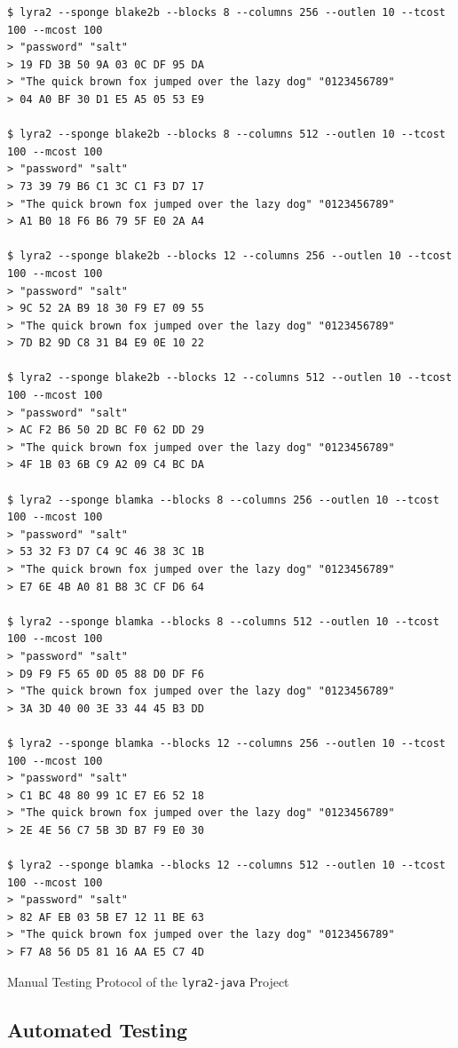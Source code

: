 \begin{listing}
\begin{verbatim}
$ lyra2 --sponge blake2b --blocks 8 --columns 256 --outlen 10 --tcost 100 --mcost 100
> "password" "salt"
> 19 FD 3B 50 9A 03 0C DF 95 DA
> "The quick brown fox jumped over the lazy dog" "0123456789"
> 04 A0 BF 30 D1 E5 A5 05 53 E9

$ lyra2 --sponge blake2b --blocks 8 --columns 512 --outlen 10 --tcost 100 --mcost 100
> "password" "salt"
> 73 39 79 B6 C1 3C C1 F3 D7 17
> "The quick brown fox jumped over the lazy dog" "0123456789"
> A1 B0 18 F6 B6 79 5F E0 2A A4

$ lyra2 --sponge blake2b --blocks 12 --columns 256 --outlen 10 --tcost 100 --mcost 100
> "password" "salt"
> 9C 52 2A B9 18 30 F9 E7 09 55
> "The quick brown fox jumped over the lazy dog" "0123456789"
> 7D B2 9D C8 31 B4 E9 0E 10 22

$ lyra2 --sponge blake2b --blocks 12 --columns 512 --outlen 10 --tcost 100 --mcost 100
> "password" "salt"
> AC F2 B6 50 2D BC F0 62 DD 29
> "The quick brown fox jumped over the lazy dog" "0123456789"
> 4F 1B 03 6B C9 A2 09 C4 BC DA

$ lyra2 --sponge blamka --blocks 8 --columns 256 --outlen 10 --tcost 100 --mcost 100
> "password" "salt"
> 53 32 F3 D7 C4 9C 46 38 3C 1B
> "The quick brown fox jumped over the lazy dog" "0123456789"
> E7 6E 4B A0 81 B8 3C CF D6 64

$ lyra2 --sponge blamka --blocks 8 --columns 512 --outlen 10 --tcost 100 --mcost 100
> "password" "salt"
> D9 F9 F5 65 0D 05 88 D0 DF F6
> "The quick brown fox jumped over the lazy dog" "0123456789"
> 3A 3D 40 00 3E 33 44 45 B3 DD

$ lyra2 --sponge blamka --blocks 12 --columns 256 --outlen 10 --tcost 100 --mcost 100
> "password" "salt"
> C1 BC 48 80 99 1C E7 E6 52 18
> "The quick brown fox jumped over the lazy dog" "0123456789"
> 2E 4E 56 C7 5B 3D B7 F9 E0 30

$ lyra2 --sponge blamka --blocks 12 --columns 512 --outlen 10 --tcost 100 --mcost 100
> "password" "salt"
> 82 AF EB 03 5B E7 12 11 BE 63
> "The quick brown fox jumped over the lazy dog" "0123456789"
> F7 A8 56 D5 81 16 AA E5 C7 4D
\end{verbatim}
\caption{Manual Testing Protocol of the \texttt{lyra2-java} Project}
\label{fig:manual-testing}
\end{listing}

\subsection{Automated Testing}
\label{sec:automated-testing}

